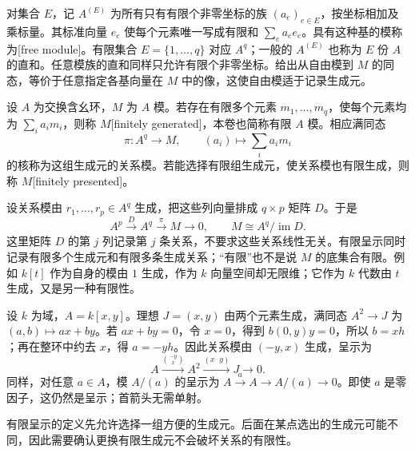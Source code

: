 \ProseParagraphBreak

对集合 \(E\)，记 \(A^{(E)}\) 为所有只有有限个非零坐标的族 \((a_e)_{e\in E}\)，按坐标相加及乘标量。其标准向量 \(e_e\) 使每个元素唯一写成有限和 \(\sum_e a_e e_e\)。具有这种基的模称为[free module]。有限集合 \(E=\{1,\ldots,q\}\) 对应 \(A^q\)；一般的 \(A^{(E)}\) 也称为 \(E\) 份 \(A\) 的直和。任意模族的直和同样只允许有限个非零坐标。给出从自由模到 \(M\) 的同态，等价于任意指定各基向量在 \(M\) 中的像，这使自由模适于记录生成元。

\begin{definition}\label{g5:def:finite-presentation}
	设 \(A\) 为交换含幺环，\(M\) 为 \(A\) 模。若存在有限多个元素 \(m_1,\ldots,m_q\)，使每个元素均为 \(\sum_i a_i m_i\)，则称 \(M\)[finitely generated]，本卷也简称有限 \(A\) 模。相应满同态
	\[
		\pi:A^q\longrightarrow M,\qquad (a_i)\longmapsto\sum_i a_i m_i
	\]
	的核称为这组生成元的关系模。若能选择有限组生成元，使关系模也有限生成，则称 \(M\)[finitely presented]。
\end{definition}

设关系模由 \(r_1,\ldots,r_p\in A^q\) 生成，把这些列向量排成 \(q\times p\) 矩阵 \(D\)。于是
\begin{equation}\label{g5:eq:matrix-presentation}
	A^p\xrightarrow{\,D\,}A^q\xrightarrow{\,\pi\,}M\longrightarrow0,
	\qquad M\cong A^q/\operatorname{im}D.
\end{equation}
这里矩阵 \(D\) 的第 \(j\) 列记录第 \(j\) 条关系，不要求这些关系线性无关。有限呈示同时记录有限多个生成元和有限多条生成关系；“有限”也不是说 \(M\) 的底集合有限。例如 \(k[t]\) 作为自身的模由 \(1\) 生成，作为 \(k\) 向量空间却无限维；它作为 \(k\) 代数由 \(t\) 生成，又是另一种有限性。

\begin{example}\label{g5:exm:ideal-relation-matrix}
	设 \(k\) 为域，\(A=k[x,y]\)。理想 \(J=(x,y)\) 由两个元素生成，满同态 \(A^2\rightarrow J\) 为 \((a,b)\mapsto ax+by\)。若 \(ax+by=0\)，令 \(x=0\)，得到 \(b(0,y)y=0\)，所以 \(b=xh\)；再在整环中约去 \(x\)，得 \(a=-yh\)。因此关系模由 \((-y,x)\) 生成，呈示为
	\[
		A\xrightarrow{\binom{-y}{x}}A^2
		\xrightarrow{(x\;\;y)}J\longrightarrow0.
	\]
	同样，对任意 \(a\in A\)，模 \(A/(a)\) 的呈示为 \(A\xrightarrow{a}A\rightarrow A/(a)\rightarrow0\)。即使 \(a\) 是零因子，这仍然是呈示；首箭头无需单射。
\end{example}

有限呈示的定义先允许选择一组方便的生成元。后面在某点选出的生成元可能不同，因此需要确认更换有限生成元不会破坏关系的有限性。

